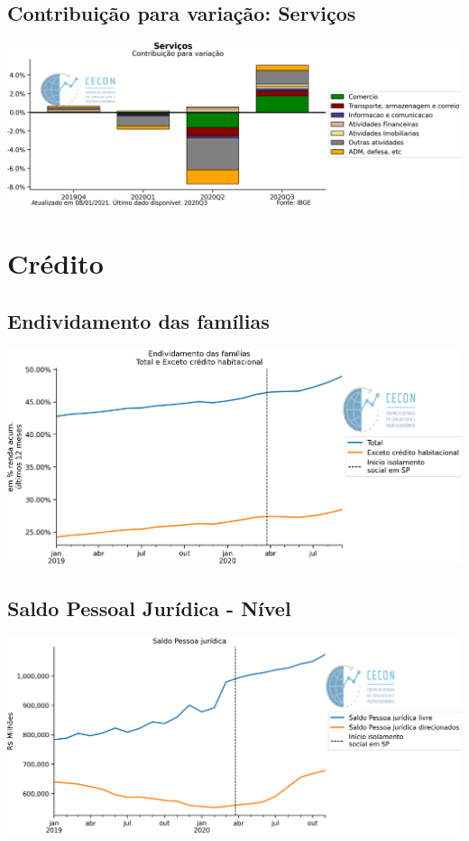 \documentclass{SelfArx}
\begin{document}
\subsection*{Contribuição para variação: Serviços}
\label{sec:org5cf5f9f}

\begin{center}
\includegraphics[width=.9\linewidth]{./figs/PIB/Contrib_Servicos.png}
\end{center}

\section*{Crédito}
\label{sec:org3e5da51}

\subsection*{Endividamento das famílias}
\label{sec:orge0de064}

\begin{center}
\includegraphics[width=.9\linewidth]{./figs/Credito/EndividamentoFamilias.png}
\end{center}


\subsection*{Saldo Pessoal Jurídica - Nível}
\label{sec:orge784045}

\begin{center}
\includegraphics[width=.9\linewidth]{./figs/Credito/SaldoPJ.png}
\end{center}
\end{document}

